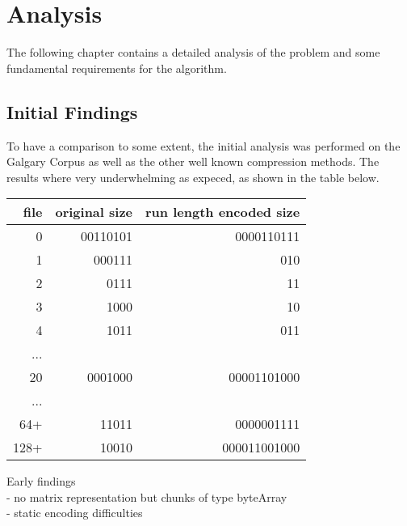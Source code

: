 
\chapter{Analysis}
\label{ch:Analysis}

\par{
The following chapter contains a detailed analysis of the problem and some fundamental requirements for the algorithm. 
}

\section{Initial Findings}
\label{ch:Analysis:sec:Initial Findings}

\par{
To have a comparison to some extent, the initial analysis was performed on the Galgary Corpus as well as the other well known compression methods. The results where very underwhelming as expeced, as shown in the table below.
}

\begin{center}
	\begin{tabular}[p]{r|r|r}
		
		file &  original size & run length encoded size\\
		\hline
		0 &  00110101 & 0000110111\\
		1 & 000111 & 010\\
		2 & 0111 & 11\\
		3 & 1000 & 10\\
		4 & 1011 & 011\\
		... &  & \\
		20 & 0001000 & 00001101000\\
		... & & \\
		64+ & 11011 & 0000001111\\
		128+ & 10010 & 000011001000
		\label{tab:t4 run length Huffman codes}
	\end{tabular}
\end{center}



\par{
	Early findings\\
- no matrix representation but chunks of type byteArray\\
- static encoding difficulties\\
}

